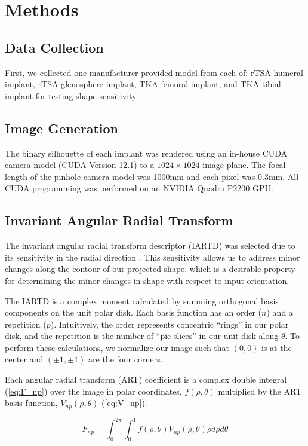 \section{Methods}

\subsection{Data Collection}
First, we collected one manufacturer-provided model from each of: rTSA humeral implant, rTSA glenosphere implant, TKA femoral implant, and TKA tibial implant for testing shape sensitivity.
\subsection{Image Generation}
The binary silhouette of each implant was rendered using an in-house CUDA camera model (CUDA Version 12.1) \cite{nickollsScalableParallelProgramming2008} to a $1024\times 1024$ image plane.
The focal length of the pinhole camera model was 1000mm and each pixel was 0.3mm.
All CUDA programming was performed on an NVIDIA Quadro P2200 GPU.
\subsection{Invariant Angular Radial Transform}
The invariant angular radial transform descriptor (IARTD) was selected due to its sensitivity in the radial direction \cite{leeNewShapeDescription2012}.
This sensitivity allows us to address minor changes along the contour of our projected shape, which is a desirable property for determining the minor changes in shape with respect to input orientation.

The IARTD is a complex moment calculated by summing orthogonal basis components on the unit polar disk.
Each basis function has an order ($n$) and a repetition ($p$).
Intuitively, the order represents concentric ``rings'' in our polar disk, and the repetition is the number of ``pie slices'' in our unit disk along $\theta$.
To perform these calculations, we normalize our image such that $(0,0)$ is at the center and $(\pm1,\pm1)$ are the four corners.

Each angular radial transform (ART) coefficient is a complex double integral (\cref{eq:F_np}) over the image in polar coordinates, $f(\rho,\theta)$ multiplied by the ART basis function, $V_{np}(\rho,\theta)$ (\cref{eq:V_np}).

\begin{equation}
	\label{eq:F_np}
	F_{np} = \int_{0}^{2\pi}\int_{0}^{1}f(\rho,\theta)V_{np}(\rho,\theta)\rho d\rho d\theta
\end{equation}

